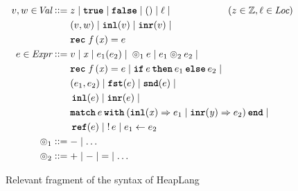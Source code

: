 \documentclass[thesis.tex]{subfiles}
\begin{document}
\begin{figure}[t]
  \begin{center}
    \begin{align*}
      \val,\valB \in \Val \bnfdef{} &
      z \mid
      \True \mid \False \mid
      \TT \mid
      \loc \mid                     \hspace*{2cm} (z \in \integer, \loc \in \Loc) \\ &
      (\val,\valB) \mid
      \Inl(\val) \mid
      \Inr(\val) \mid                                                             \\ &
      \Rec\lvarF\,(\lvar)= \expr                                                  \\
      \expr \in \Expr \bnfdef{}     &
      \val \mid
      \lvar \mid
      \expr_1(\expr_2) \mid
      {}
      \HLOp_1 \expr \mid
      \expr_1 \HLOp_2 \expr_2 \mid                                                \\ &
      \Rec\lvarF\,(\lvar)= \expr \mid
      \If \expr then \expr_1 \Else \expr_2 \mid
      {}                                                                          \\ &
      (\expr_1,\expr_2) \mid
      \Fst(\expr) \mid
      \Snd(\expr) \mid
      {}                                                                          \\ &
      \Inl(\expr) \mid
      \Inr(\expr) \mid                                                            \\ &
      \Match \expr with (\Inl(\lvar) => \expr_1 | \Inr(\lvarB) => \expr_2) end \mid
      {}                                                                          \\ &
      \Alloc(\expr) \mid
      \deref \expr \mid
      \expr_1 \gets \expr_2                                                       \\
      \HLOp_1 \bnfdef{}             & - \mid \ldots                               \\
      \HLOp_2 \bnfdef{}             & + \mid - \mid \mathop{=} \mid \ldots
    \end{align*}
    \caption{Relevant fragment of the syntax of HeapLang}
    \label{fig:heaplangsyntax}
  \end{center}
\end{figure}
\end{document}

